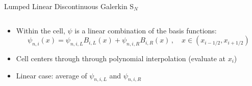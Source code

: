 \documentclass[10pt]{beamer}
\newcommand{\SN}{S$_N$\xspace}
\begin{document}
\begin{frame}{Lumped Linear Discontinuous Galerkin \SN}
\begin{columns}
\begin{column}{1.06\textwidth}
\begin{itemize}
		\item 
		Within the cell, $\psi$ is a linear combination of the basis functions:
		\begin{equation*}
			\psi_{n,i}(x) = \psi_{n,i,L} B_{i,L}(x) + \psi_{n,i,R} B_{i,R}(x) \,, \quad x \in (x_{i-1/2},x_{i+1/2})
		\end{equation*}
		\item 
		Cell centers through through polynomial interpolation (evaluate at $x_i$) 

		\item 
		Linear case: average of $\psi_{n,i,L}$ and $\psi_{n,i,R}$ 

	\end{itemize}

	\end{column}
	\end{columns}

\end{frame}






% 		

\end{document}
